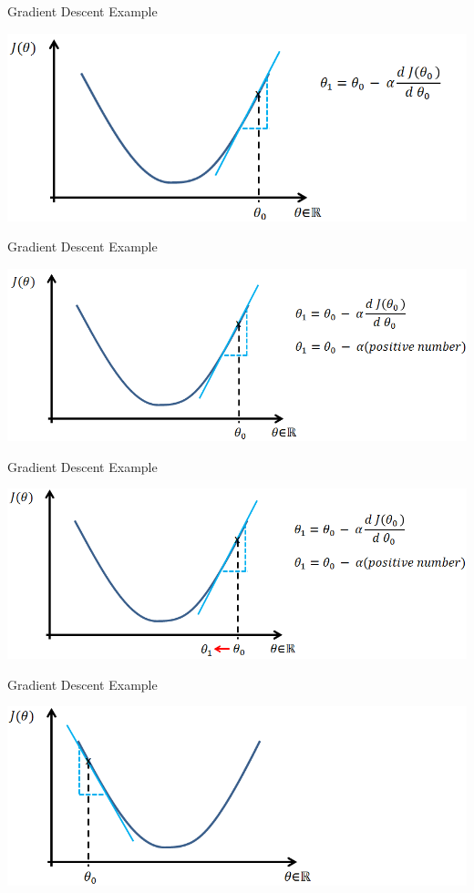 \documentclass{beamer}
\begin{document}
\begin{frame}{Gradient Descent Example}
\begin{center}
\includegraphics[width=1.1\textwidth]{gd2}
\end{center}
\end{frame}


\begin{frame}{Gradient Descent Example}
\begin{center}
\includegraphics[width=1.1\textwidth]{gd3}
\end{center}
\end{frame}

\begin{frame}{Gradient Descent Example}
\begin{center}
\includegraphics[width=1.1\textwidth]{gd4}
\end{center}
\end{frame}

\begin{frame}{Gradient Descent Example}
\begin{center}
\includegraphics[width=1.1\textwidth]{gd5}
\end{center}
\end{frame}
\end{document}
